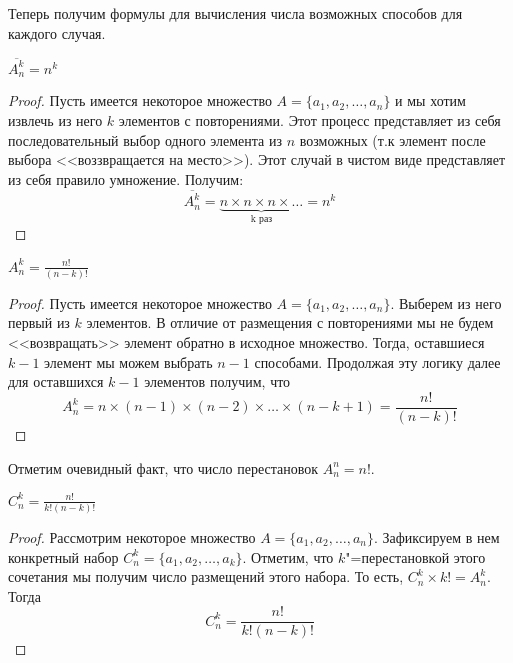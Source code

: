 Теперь получим формулы для вычисления числа возможных способов
для каждого случая.

\begin{theorem}
    $\overline{A_n^k} = n^k$
\end{theorem}

\begin{proof}
    Пусть имеется некоторое множество $A = \{a_1, a_2, \dots, a_n\}$
    и мы хотим извлечь из него $k$ элементов с повторениями. Этот процесс
    представляет из себя последовательный выбор одного элемента из $n$ возможных
    (т.к элемент после выбора <<воззвращается на место>>). Этот случай
    в чистом виде представляет из себя правило умножение. Получим:
    \begin{equation*}
        \displaystyle \overline{A_n^k} = \underbrace{n \times n \times n \times \dots}_{\text{k раз}} = n^k
    \end{equation*}
\end{proof}

\begin{theorem}
    $\displaystyle A_n^k = \frac{n!}{(n - k)!}$
\end{theorem}

\begin{proof}
    Пусть имеется некоторое множество $A = \{a_1, a_2, \dots, a_n\}$.
    Выберем из него первый из $k$ элементов. В отличие от размещения с повторениями
    мы не будем <<возвращать>> элемент обратно в исходное множество.
    Тогда, оставшиеся $k - 1$ элемент мы можем выбрать $n - 1$ способами.
    Продолжая эту логику далее для оставшихся $k - 1$ элементов получим, что
    \begin{equation*}
        \displaystyle A_n^k = n \times (n - 1) \times (n - 2) \times \dots \times (n - k + 1) = \frac{n!}{(n - k)!}
    \end{equation*}
\end{proof}

Отметим очевидный факт, что число перестановок $\displaystyle A_n^n = n!$.

\begin{theorem}
    $\displaystyle C_n^k = \frac{n!}{k!(n - k)!}$
\end{theorem}

\begin{proof}
    Рассмотрим некоторое множество $A = \{a_1, a_2, \dots, a_n\}$. Зафиксируем в нем конкретный набор $C_n^k = \{a_1, a_2, \dots, a_k\}$.
    Отметим, что $k$"=перестановкой этого сочетания мы получим 
    число размещений этого набора. То есть, $C_n^k \times k! = A_n^k$.
    Тогда
    \begin{equation}
     C_n^k = \frac{n!}{k!(n - k)!}
    \end{equation} 
\end{proof}

